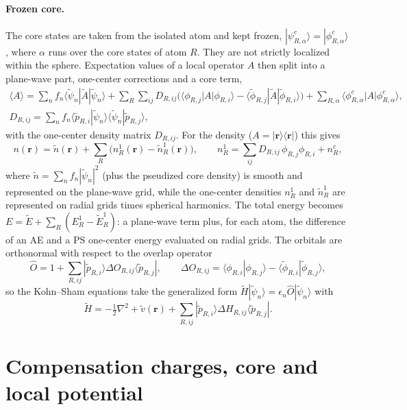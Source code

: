 \documentclass[11pt,a4paper,oneside]{book}
\newcommand{\bra}[1]{\langle #1|}
\newcommand{\ket}[1]{|#1\rangle}
\newcommand{\braket}[2]{\langle #1|#2\rangle}
\newcommand{\pt}{\tilde p}
\begin{document}
\paragraph{Frozen core.} The core states are taken from the isolated
atom and kept frozen, $\ket{\psi^c_{R,\alpha}}=\ket{\phi^c_{R,\alpha}}$, where
$\alpha$ runs over the core states of atom $R$. They are not strictly
localized within the sphere. Expectation values of a local operator $A$
then split into a plane-wave part, one-center corrections and a core
term,
\begin{multline}
  \langle A\rangle = \sum_n f_n\bra{\tilde\psi_n}\tilde A\ket{\tilde\psi_n}
  + \sum_R\sum_{ij}D_{R,ij}\bigl(\bra{\phi_{R,j}}A\ket{\phi_{R,i}}
  -\bra{\tilde\phi_{R,j}}\tilde A\ket{\tilde\phi_{R,i}}\bigr)
  + \sum_{R,\alpha}\bra{\phi^c_{R,\alpha}}A\ket{\phi^c_{R,\alpha}},
  \\
  D_{R,ij}=\sum_n f_n\braket{\pt_{R,i}}{\tilde\psi_n}\braket{\tilde\psi_n}{\pt_{R,j}},
\end{multline}
with the one-center density matrix $D_{R,ij}$. For the density
($A=\ket{\bm r}\bra{\bm r}$) this gives
\begin{equation}
  n(\bm r)=\tilde n(\bm r)+\sum_R\bigl(n^1_R(\bm r)-\tilde n^1_R(\bm r)\bigr),
  \qquad
  n^1_R=\sum_{ij}D_{R,ij}\,\phi_{R,j}\phi_{R,i}+n^c_R,
\end{equation}
where $\tilde n=\sum_nf_n|\tilde\psi_n|^2$ (plus the pseudized core
density) is smooth and represented on the plane-wave grid, while the
one-center densities $n^1_R$ and $\tilde n^1_R$ are represented on radial
grids times spherical harmonics. The total energy becomes $E=\tilde E+\sum_R(E^1_R-\tilde E^1_R)$: a
plane-wave term plus, for each atom, the difference of an AE and a PS
one-center energy evaluated on radial grids. The orbitals are orthonormal
with respect to the overlap operator
\begin{equation}
  \hat O = 1+\sum_{R,ij}\ket{\pt_{R,i}}\Delta O_{R,ij}\bra{\pt_{R,j}},
  \qquad
  \Delta O_{R,ij}=\braket{\phi_{R,i}}{\phi_{R,j}}-\braket{\tilde\phi_{R,i}}{\tilde\phi_{R,j}},
\end{equation}
so the Kohn--Sham equations take the generalized form
$\tilde H\ket{\tilde\psi_n}=\epsilon_n\hat O\ket{\tilde\psi_n}$ with
\begin{equation}
  \tilde H=-\tfrac12\nabla^2+\tilde v(\bm r)
  +\sum_{R,ij}\ket{\pt_{R,i}}\Delta H_{R,ij}\bra{\pt_{R,j}} .
\end{equation}

\section{Compensation charges, core and local potential}
\end{document}
